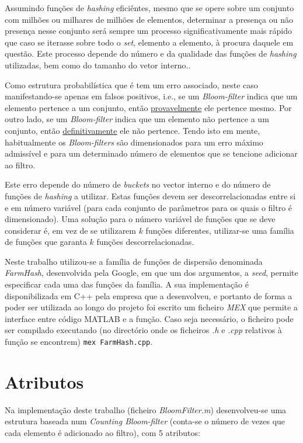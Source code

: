 \documentclass[a4paper,11pt,openright,oneside]{report}
\begin{document}
Assumindo funções de \textit{hashing} eficiêntes, mesmo que se opere sobre um conjunto com milhões ou milhares de milhões de elementos, determinar a presença ou não presença nesse conjunto será sempre um processo significativamente mais rápido que caso se iterasse sobre todo o \textit{set}, elemento a elemento, à procura daquele em questão. Este processo depende do número e da qualidade das funções de \textit{hashing} utilizadas, bem como do tamanho do vetor interno..

Como estrutura probabilística que é tem um erro associado, neste caso manifestando-se apenas em falsos positivos, i.e., se um \textit{Bloom-filter} indica que um elemento pertence a um conjunto, então \underline{provavelmente} ele pertence mesmo. Por outro lado, se um \textit{Bloom-filter} indica que um elemento não pertence a um conjunto, então \underline{definitivamente} ele não pertence. Tendo isto em mente, habitualmente os \textit{Bloom-filters} são dimensionados para um erro máximo admissível e para um determinado número de elementos que se tencione adicionar ao filtro.

Este erro depende do número de \textit{buckets} no vector interno e do número de funções de \textit{hashing} a utilizar. Estas funções devem ser descorrelacionadas entre si e em número variável (para cada conjunto de parâmetros para os quais o filtro é dimensionado). Uma solução para o número variável de funções que se deve considerar é, em vez de se utilizarem $k$ funções diferentes, utilizar-se uma família de funções que garanta $k$ funções descorrelacionadas.

Neste trabalho utilizou-se a família de funções de dispersão denominada \textit{FarmHash}, desenvolvida pela Google, em que um dos argumentos, a \textit{seed}, permite especificar cada uma das funções da família. A sua implementação é disponibilizada em C++ pela empresa que a desenvolveu, e portanto de forma a poder ser utilizada ao longo do projeto foi escrito um ficheiro \textit{MEX} que permite a interface entre código MATLAB e a função. Caso seja necessário, o ficheiro pode ser compilado executando (no directório onde os ficheiros \textit{.h} e \textit{.cpp} relativos à função se encontrem) \verb|mex FarmHash.cpp|.

\section{Atributos}
\label{sec.attributes}

Na implementação deste trabalho (ficheiro \textit{BloomFilter.m}) desenvolveu-se uma estrutura baseada num \textit{Counting Bloom-filter} (conta-se o número de vezes que cada elemento é adicionado ao filtro), com 5 atributos:
\end{document}
